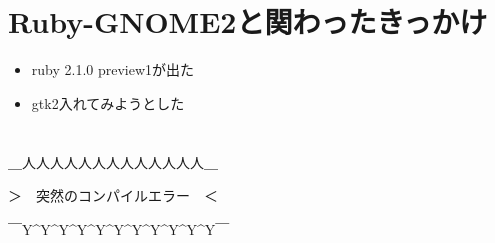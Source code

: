 \section{Ruby-GNOME2と関わったきっかけ}

\begin{itemize}
\item ruby 2.1.0 preview1が出た
\item gtk2入れてみようとした
\end{itemize}

\section{}

{\Large
＿人人人人人人人人人人人人人＿

＞　突然のコンパイルエラー　＜

￣Y\^{}Y\^{}Y\^{}Y\^{}Y\^{}Y\^{}Y\^{}Y\^{}Y\^{}Y\^{}Y￣
}